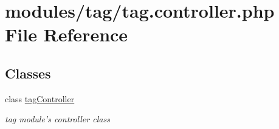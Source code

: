 \hypertarget{tag_8controller_8php}{\section{modules/tag/tag.controller.\-php File Reference}
\label{tag_8controller_8php}
}
\subsection*{Classes}
\begin{DoxyCompactItemize}
\item 
class \hyperlink{classtagController}{tag\-Controller}
\begin{DoxyCompactList}\small\item\em tag module's controller class \end{DoxyCompactList}\end{DoxyCompactItemize}
